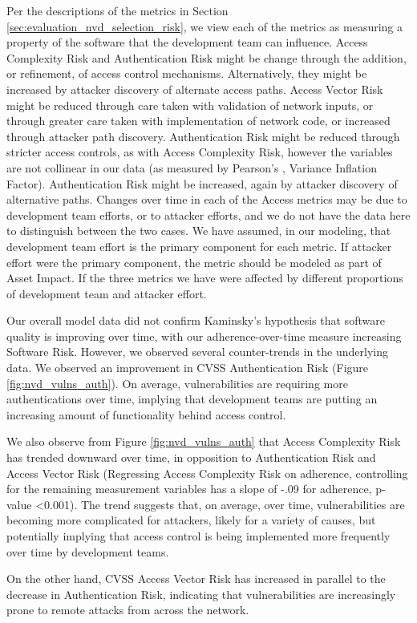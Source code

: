 Per the descriptions of the metrics in Section \ref{sec:evaluation_nvd_selection_risk}, we view each of the metrics as measuring a property of the software that the development team can influence. Access Complexity Risk and Authentication Risk might be change through the addition, or refinement, of access control mechanisms. Alternatively, they might be increased by attacker discovery of alternate access paths.   Access Vector Risk might be reduced through care taken with validation of network inputs, or through greater care taken with implementation of network code, or increased through attacker path discovery. Authentication Risk might be reduced through stricter access controls, as with Access Complexity Risk, however the variables are not collinear in our data (as measured by Pearson's , Variance Inflation Factor). Authentication Risk might be increased, again by attacker discovery of alternative paths. Changes over time in each of the Access metrics may be due to development team efforts, or to attacker efforts, and we do not have the data here to distinguish between the two cases. We have assumed, in our modeling, that development team effort is the primary component for each metric. If attacker effort were the primary component, the metric should be modeled as part of Asset Impact.  If the three metrics we have were affected by different proportions of development team and attacker effort.

Our overall model data did not confirm Kaminsky's hypothesis that software quality is improving over time, with our adherence-over-time measure increasing Software Risk. However, we observed several counter-trends in the underlying data. We observed an improvement in CVSS Authentication Risk (Figure \ref{fig:nvd_vulns_auth}). On average, vulnerabilities are requiring more authentications over time, implying that development teams are putting an increasing amount of functionality behind access control.

We also observe from Figure \ref{fig:nvd_vulns_auth} that Access Complexity Risk has trended downward over time, in opposition to Authentication Risk and Access Vector Risk (Regressing Access Complexity Risk on adherence, controlling for the remaining measurement variables has a slope of -.09 for adherence, p-value \textless 0.001). The trend suggests that, on average, over time, vulnerabilities are becoming more complicated for attackers, likely for a variety of causes, but potentially implying that access control is being implemented more frequently over time by development teams.

On the other hand, CVSS Access Vector Risk has increased in parallel to the decrease in Authentication Risk, indicating that vulnerabilities are increasingly prone to remote attacks from across the network.